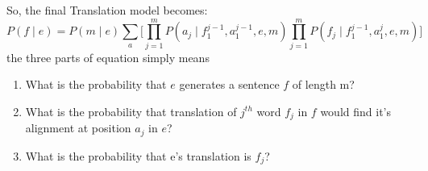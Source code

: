 So, the final Translation model becomes:
\begin{equation}
P(f\mid e) = P(m\mid e)\sum_{a}\Bigg[ \prod_{j=1}^{m}P(a_{j}\mid f_{1}^{j-1},a_{1}^{j-1},e,m)\prod_{j=1}^{m}P(f_{j}\mid f_{1}^{j-1},a_{1}^{j},e,m)\Bigg] 
\end{equation}
the three parts of equation simply means
\begin{enumerate}
\item What is the probability that $e$ generates a sentence $f$ of length m?
\item What is the probability that translation of $j^{th}$ word $f_{j}$ in $f$ would find it's alignment at position $a_{j}$ in $e$?
\item What is the probability that e's translation is $f_{j}$?
\end{enumerate}







